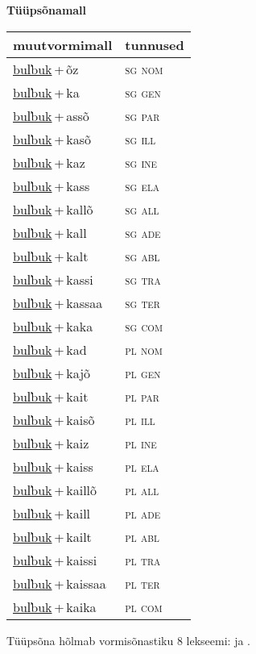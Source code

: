
\vspace{1.8em}
\begin{minipage}{\textwidth}
\textbf{Tüüpsõnamall \,}\\

\begin{sideways}
\begin{tabular}{l l}
muutvormimall & tunnused \\
\hline
\underline{bul̕buk}\,+\,õz & \textsc{ sg nom } \\
\underline{bul̕buk}\,+\,ka & \textsc{ sg gen } \\
\underline{bul̕buk}\,+\,assõ & \textsc{ sg par } \\
\underline{bul̕buk}\,+\,kasõ & \textsc{ sg ill } \\
\underline{bul̕buk}\,+\,kaz & \textsc{ sg ine } \\
\underline{bul̕buk}\,+\,kass & \textsc{ sg ela } \\
\underline{bul̕buk}\,+\,kallõ & \textsc{ sg all } \\
\underline{bul̕buk}\,+\,kall & \textsc{ sg ade } \\
\underline{bul̕buk}\,+\,kalt & \textsc{ sg abl } \\
\underline{bul̕buk}\,+\,kassi & \textsc{ sg tra } \\
\underline{bul̕buk}\,+\,kassaa & \textsc{ sg ter } \\
\underline{bul̕buk}\,+\,kaka & \textsc{ sg com } \\
\underline{bul̕buk}\,+\,kad & \textsc{ pl nom } \\
\underline{bul̕buk}\,+\,kajõ & \textsc{ pl gen } \\
\underline{bul̕buk}\,+\,kait & \textsc{ pl par } \\
\underline{bul̕buk}\,+\,kaisõ & \textsc{ pl ill } \\
\underline{bul̕buk}\,+\,kaiz & \textsc{ pl ine } \\
\underline{bul̕buk}\,+\,kaiss & \textsc{ pl ela } \\
\underline{bul̕buk}\,+\,kaillõ & \textsc{ pl all } \\
\underline{bul̕buk}\,+\,kaill & \textsc{ pl ade } \\
\underline{bul̕buk}\,+\,kailt & \textsc{ pl abl } \\
\underline{bul̕buk}\,+\,kaissi & \textsc{ pl tra } \\
\underline{bul̕buk}\,+\,kaissaa & \textsc{ pl ter } \\
\underline{bul̕buk}\,+\,kaika & \textsc{ pl com } \\
\end{tabular}
\end{sideways}
\label{tab:tüüpsõnamall-bul̕bukõz}

\end{minipage}

 
\vspace{1em}
\noindent Tüüpsõna hõlmab vormisõnastiku 8 lekseemi:  ja .
